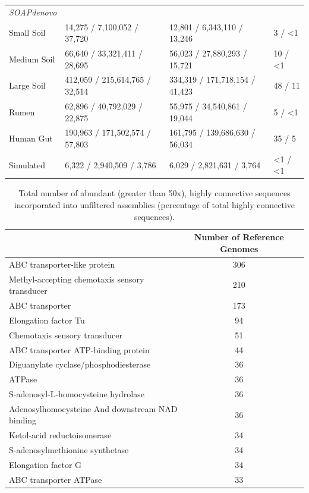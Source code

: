 \documentclass[10pt]{article}
\begin{document}
\begin{table}[ht]
\begin{tabular}{l l l l}
\emph{SOAPdenovo}   \\ 
Small Soil		&14,275 / 7,100,052 / 37,720	&12,801 / 6,343,110 / 13,246		&3 / \textless1\\
Medium Soil	&66,640 / 33,321,411 / 28,695	&56,023 / 27,880,293 / 15,721		&10 / \textless1\\
Large Soil		&412,059 / 215,614,765 / 32,514	&334,319 /  171,718,154 / 41,423	&48 / 11\\
Rumen		&62,896 / 40,792,029 / 22,875		&55,975 / 34,540,861 / 19,044	&5 / \textless 1\\
Human Gut	&190,963 / 171,502,574 / 57,803	&161,795 / 139,686,630 / 56,034	&35 / 5\\
Simulated		&6,322 / 2,940,509 / 3,786		&6,029 / 2,821,631 / 3,764	&\textless1 / \textless1\\
\end{tabular}
\end{table}



\begin{table}
\caption{Total number of abundant (greater than 50x), highly connective sequences incorporated into unfiltered assemblies (percentage of total highly connective sequences).}
\begin{tabular}{lc c}
\hline
& Number of Reference Genomes\\
\hline
ABC transporter-like protein	&306\\
Methyl-accepting chemotaxis sensory transducer	&210\\
ABC transporter	&173\\
Elongation factor Tu	&94\\
Chemotaxis sensory transducer	&51\\
ABC transporter ATP-binding protein	&44\\
Diguanylate cyclase/phosphodiesterase	&36\\
ATPase	&36\\
S-adenosyl-L-homocysteine hydrolase	&36\\
Adenosylhomocysteine And downstream NAD binding	&36\\
Ketol-acid reductoisomerase	&34\\
S-adenosylmethionine synthetase	&34\\
Elongation factor G	&34\\
ABC transporter ATPase	&33\\
\end{tabular}
\end{table}
\end{document}
